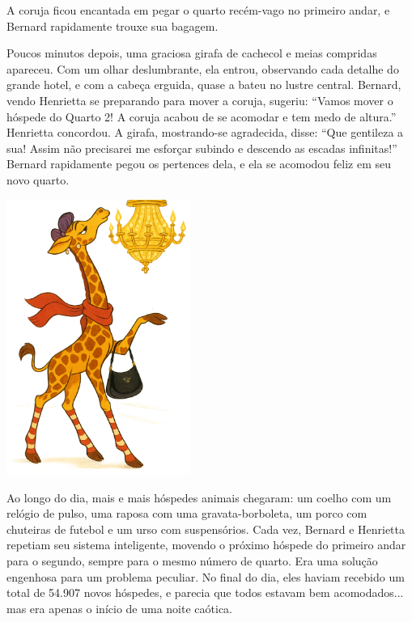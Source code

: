 A coruja ficou encantada em pegar o quarto recém-vago no primeiro andar, e Bernard rapidamente trouxe sua bagagem.

Poucos minutos depois, uma graciosa girafa de cachecol e meias compridas apareceu. Com um olhar deslumbrante, ela entrou, observando cada detalhe do grande hotel, e com a cabeça erguida, quase a bateu no lustre central. Bernard, vendo Henrietta se preparando para mover a coruja, sugeriu: ``Vamos mover o hóspede do Quarto 2! A coruja acabou de se acomodar e tem medo de altura.'' Henrietta concordou. A girafa, mostrando-se agradecida, disse: ``Que gentileza a sua! Assim não precisarei me esforçar subindo e descendo as escadas infinitas!'' Bernard rapidamente pegou os pertences dela, e ela se acomodou feliz em seu novo quarto.

\vfill
\begin{center}
\includegraphics[width=0.45\textwidth]{images/giraffe.png}
\end{center}

\clearpage


Ao longo do dia, mais e mais hóspedes animais chegaram: um coelho com um relógio de pulso, uma raposa com uma gravata-borboleta, um porco com chuteiras de futebol e um urso com suspensórios. Cada vez, Bernard e Henrietta repetiam seu sistema inteligente, movendo o próximo hóspede do primeiro andar para o segundo, sempre para o mesmo número de quarto. Era uma solução engenhosa para um problema peculiar. No final do dia, eles haviam recebido um total de 54.907 novos hóspedes, e parecia que todos estavam bem acomodados... mas era apenas o início de uma noite caótica.

